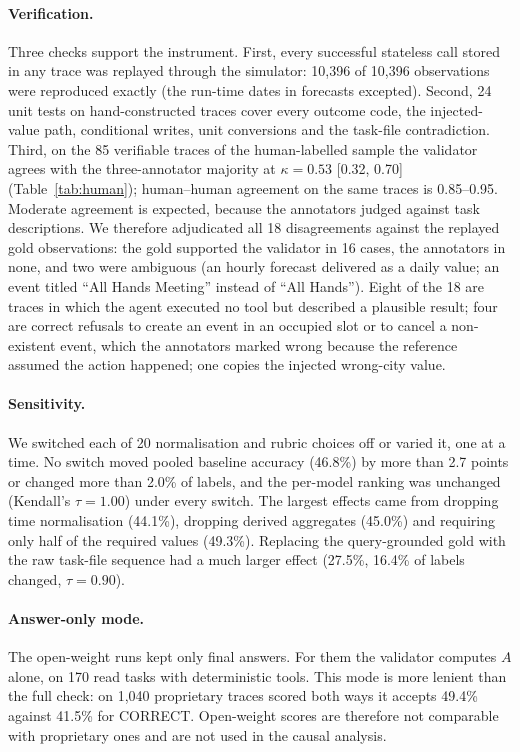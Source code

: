 \documentclass[pdflatex,sn-mathphys-num,Numbered]{sn-jnl}
\begin{document}


\paragraph{Verification.} Three checks support the instrument. First, every successful stateless call stored in any trace was replayed through the simulator: 10,396 of 10,396 observations were reproduced exactly (the run-time dates in forecasts excepted). Second, 24 unit tests on hand-constructed traces cover every outcome code, the injected-value path, conditional writes, unit conversions and the task-file contradiction. Third, on the 85 verifiable traces of the human-labelled sample the validator agrees with the three-annotator majority at $\kappa=0.53$ [0.32, 0.70] (Table~\ref{tab:human}); human--human agreement on the same traces is 0.85--0.95. Moderate agreement is expected, because the annotators judged against task descriptions. We therefore adjudicated all 18 disagreements against the replayed gold observations: the gold supported the validator in 16 cases, the annotators in none, and two were ambiguous (an hourly forecast delivered as a daily value; an event titled ``All Hands Meeting'' instead of ``All Hands''). Eight of the 18 are traces in which the agent executed no tool but described a plausible result; four are correct refusals to create an event in an occupied slot or to cancel a non-existent event, which the annotators marked wrong because the reference assumed the action happened; one copies the injected wrong-city value.



\paragraph{Sensitivity.} We switched each of 20 normalisation and rubric choices off or varied it, one at a time. No switch moved pooled baseline accuracy (46.8\%) by more than 2.7 points or changed more than 2.0\% of labels, and the per-model ranking was unchanged (Kendall's $\tau=1.00$) under every switch. The largest effects came from dropping time normalisation (44.1\%), dropping derived aggregates (45.0\%) and requiring only half of the required values (49.3\%). Replacing the query-grounded gold with the raw task-file sequence had a much larger effect (27.5\%, 16.4\% of labels changed, $\tau=0.90$).

\paragraph{Answer-only mode.} The open-weight runs kept only final answers. For them the validator computes $A$ alone, on 170 read tasks with deterministic tools. This mode is more lenient than the full check: on 1,040 proprietary traces scored both ways it accepts 49.4\% against 41.5\% for CORRECT. Open-weight scores are therefore not comparable with proprietary ones and are not used in the causal analysis.
\end{document}

